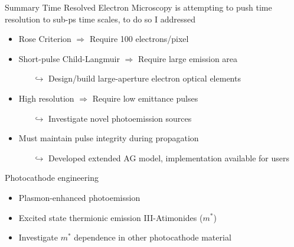 \documentclass[mathserif]{beamer}
\begin{document}
\begin{frame}{Summary}
Time Resolved Electron Microscopy is attempting to push time resolution to sub-ps time scales, to do so I addressed
\begin{itemize}
  \item Rose Criterion $\Rightarrow$ Require 100 electrons/pixel
  \item Short-pulse Child-Langmuir $\Rightarrow$ Require large emission area
  \begin{itemize}
    \item[$\hookrightarrow$] Design/build large-aperture electron optical elements
  \end{itemize}
  \item High resolution $\Rightarrow$ Require low emittance pulses
  \begin{itemize}
    \item[$\hookrightarrow$] Investigate novel photoemission sources
  \end{itemize}
  \item Must maintain pulse integrity during propagation
  \begin{itemize}
    \item[$\hookrightarrow$] Developed extended AG model, implementation available for users
  \end{itemize}
\end{itemize}

Photocathode engineering
\begin{itemize}
  \item Plasmon-enhanced photoemission
  \item Excited state thermionic emission III-Atimonides ($m^*$)
  \item Investigate $m^*$ dependence in other photocathode material
\end{itemize}

\end{frame}
\end{document}
